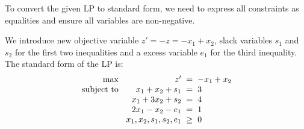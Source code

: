 \documentclass[a4paper, 10pt]{article}
\begin{document}
\begin{solution}
To convert the given LP to standard form, we need to express all constraints as equalities and ensure all variables are non-negative.

\vspace{2mm}

\par\hspace{5mm} We introduce new objective variable \( z' = -z = -x_1 + x_2 \), slack variables \( s_1 \) and \( s_2 \) for the first two inequalities and a excess variable \( e_1 \) for the third inequality. The standard form of the LP is:
\[
\begin{array}{@{\hspace{2mm}} r @{\hspace{2mm}} r @{\hspace{2mm}} c @{\hspace{2mm}} l}
    \text{max } & z' & = & -x_1 + x_2 \\
    \text{subject to } & x_1 + x_2 + s_1 & = & 3 \\
    & x_1 + 3x_2 + s_2 & = & 4 \\
    & 2x_1 - x_2 - e_1 & = & 1 \\
    & x_1, x_2, s_1, s_2, e_1 & \geq & 0
\end{array}
\]


\end{solution}
\end{document}
